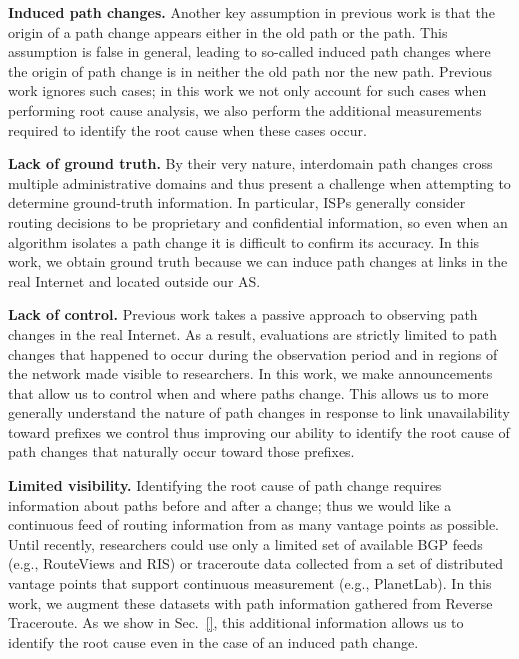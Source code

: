 \textbf{Induced path changes.} \label{sec:induced}Another key assumption in 
previous work is that the origin of a path change appears 
either in the old path or the path. This assumption is false 
in general, leading to so-called induced path changes 
where the origin of path change is in neither the old path 
nor the new path.  Previous work ignores such cases; in this work 
we not only account for such cases when performing root 
cause analysis, we also perform the additional measurements 
required to identify the root cause when these cases occur. 

\textbf{Lack of ground truth.} By their very nature, interdomain 
path changes cross multiple administrative domains and thus 
present a challenge when attempting to determine ground-truth 
information. In particular, ISPs generally consider routing decisions to 
be proprietary and confidential information, so even when an 
algorithm isolates a path change it is difficult to confirm its accuracy. 
In this work, we obtain ground truth because we can induce path 
changes at links in the real Internet and located outside our AS.  

\textbf{Lack of control.} Previous work takes a passive approach to 
observing path changes in the real Internet. As a result, evaluations 
are strictly limited to path changes that happened to occur during the 
observation period and in regions of the network made visible to 
researchers. In this work, we make announcements that 
allow us to control when and where paths change. This allows us to 
more generally understand the nature of path changes in response 
to link unavailability toward prefixes we control thus improving our 
ability to identify the root cause of path changes that naturally occur 
toward those prefixes.

\textbf{Limited visibility.} Identifying the root cause of 
path change requires information about paths before and after a change; 
thus we would like a continuous feed of routing information from as 
many vantage points as possible. Until recently, researchers 
could use only a limited set of available BGP feeds (e.g., RouteViews and 
RIS) or traceroute data collected from a set of distributed vantage 
points that support continuous measurement (e.g., PlanetLab). In 
this work, we augment these datasets with path information gathered 
from Reverse Traceroute. As we show in Sec.~\ref{}, this additional 
information allows us to identify the root cause even in the case 
of an induced path change.


